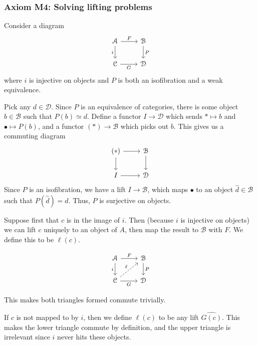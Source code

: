 \documentclass[main.tex]{subfiles}
\begin{document}
\subsubsection{Axiom M4: Solving lifting problems}
Consider a diagram
\begin{equation*}
  \begin{tikzcd}
    \mathcal{A}
    \arrow[r, "F"]
    \arrow[d, swap, "i"]
    & \mathcal{B}
    \arrow[d, "P"]
    \\
    \mathcal{C}
    \arrow[r, swap, "G"]
    & \mathcal{D}
  \end{tikzcd}
\end{equation*}
where $i$ is injective on objects and $P$ is both an isofibration and a weak equivalence.

Pick any $d \in \mathcal{D}$. Since $P$ is an equivalence of categories, there is some object $b \in \mathcal{B}$ such that $P(b) \simeq d$. Define a functor $I \to \mathcal{D}$ which sends $* \mapsto b$ and $\bullet \mapsto P(b)$, and a functor $(*) \to \mathcal{B}$ which picks out $b$. This gives us a commuting diagram
\begin{equation*}
  \begin{tikzcd}
    (*)
    \arrow[r]
    \arrow[d]
    & \mathcal{B}
    \arrow[d]
    \\
    I
    \arrow[r]
    & \mathcal{D}
  \end{tikzcd}
\end{equation*}
Since $P$ is an isofibration, we have a lift $I \to \mathcal{B}$, which maps $\bullet$ to an object $\hat{d} \in \mathcal{B}$ such that $P(\hat{d}) = d$. Thus, $P$ is surjective on objects.

Suppose first that $c$ is in the image of $i$. Then (because $i$ is injective on objects) we can lift $c$ uniquely to an object of $A$, then map the result to $\mathcal{B}$ with $F$. We define this to be $\ell(c)$.

\begin{equation*}
  \begin{tikzcd}
    \mathcal{A}
    \arrow[r, "F"]
    \arrow[d, swap, "i"]
    & \mathcal{B}
    \arrow[d, "P"]
    \\
    \mathcal{C}
    \arrow[r, swap, "G"]
    \arrow[ur, dashed, "\ell"]
    & \mathcal{D}
  \end{tikzcd}
\end{equation*}

This makes both triangles formed commute trivially.

If $c$ is not mapped to by $i$, then we define $\ell(c)$ to be any lift $\widehat{G(c)}$. This makes the lower triangle commute by definition, and the upper triangle is irrelevant since $i$ never hits these objects.
\end{document}

